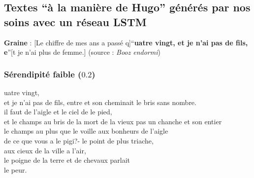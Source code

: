 \documentclass{article}
\begin{document}
		\subsection{Textes ``à la manière de Hugo'' générés par nos soins avec un réseau LSTM}\label{lstm_hugo_ex}
			\textbf{Graine} : [Le chiffre de mes ans a passé q]``\textbf{uatre vingt, et je n'ai pas de fils, e}''[t je n'ai plus de femme.] (source : \textit{Booz endormi})
			\subsubsection{Sérendipité faible ($0.2$)}
				uatre vingt,\\
				et je n'ai pas de fils, entre et son cheminait le bris sans nombre.\\
				il faut de l'aigle et le ciel de le pied,\\
				et le champs au bris de la mort de la vieux pas un chanche et son entier\\
				le champs au plus que le voille aux bonheurs de l'aigle\\
				de ce que vous a le pigi?- le point de plus triache,\\
				aux cieux de la ville a l'air,\\
				le poigne de la terre et de chevaux parlait\\
				le peur.\\
\end{document}
